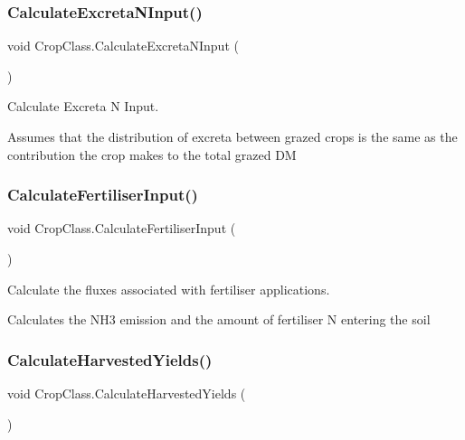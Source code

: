 \subsubsection{\texorpdfstring{CalculateExcretaNInput()}{CalculateExcretaNInput()}}
{\footnotesize\ttfamily void Crop\+Class.\+Calculate\+Excreta\+N\+Input (\begin{DoxyParamCaption}{ }\end{DoxyParamCaption})\hspace{0.3cm}{\ttfamily [inline]}}



Calculate Excreta N Input. 

Assumes that the distribution of excreta between grazed crops is the same as the contribution the crop makes to the total grazed DM \mbox{\label{class_crop_class_a8266c04c74b6f19d1f58073acc18b3a5}} 
\subsubsection{\texorpdfstring{CalculateFertiliserInput()}{CalculateFertiliserInput()}}
{\footnotesize\ttfamily void Crop\+Class.\+Calculate\+Fertiliser\+Input (\begin{DoxyParamCaption}{ }\end{DoxyParamCaption})\hspace{0.3cm}{\ttfamily [inline]}}



Calculate the fluxes associated with fertiliser applications. 

Calculates the N\+H3 emission and the amount of fertiliser N entering the soil \mbox{\label{class_crop_class_a02876da625301864f21b46da5a6f4e84}} 
\subsubsection{\texorpdfstring{CalculateHarvestedYields()}{CalculateHarvestedYields()}}
{\footnotesize\ttfamily void Crop\+Class.\+Calculate\+Harvested\+Yields (\begin{DoxyParamCaption}{ }\end{DoxyParamCaption})\hspace{0.3cm}{\ttfamily [inline]}}



